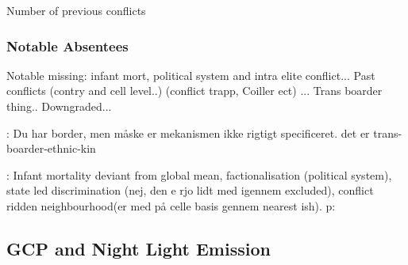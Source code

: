 \documentclass[a4paper]{article}
\begin{document}




\cite{Cederman_Gleditsch_Buhaug_2013} Number of previous conflicts



\subsubsection{Notable Absentees}\label{notable_absentees} %

Notable missing: infant mort, political system and intra elite conflict... \citep{Goldstone_2010} Past conflicts (contry and cell level..) (conflict trapp, Coiller ect) ... Trans boarder thing.. Downgraded... \citep{Cederman_Gleditsch_Buhaug_2013}

\cite[119-142]{Cederman_Gleditsch_Buhaug_2013}: Du har border, men måske er mekanismen ikke rigtigt specificeret. det er trans-boarder-ethnic-kin

\cite{Goldstone_2010} : Infant mortality deviant from global mean, factionalisation (political system), state led discrimination (nej, den e rjo lidt med igennem excluded), conflict ridden neighbourhood(er med på celle basis gennem nearest ish). p: 




\subsection{GCP and Night Light Emission}\label{GCP_corr}
\end{document}
